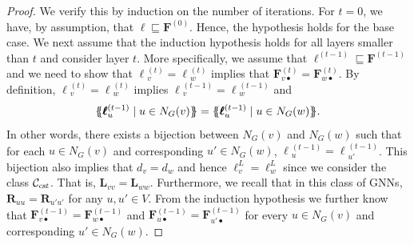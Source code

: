 \begin{proof}
We verify this by induction on the number of iterations. For $t=0$, we have, by assumption, that 
$\pmb{\ell}\sqsubseteq \mathbf{F}^{(0)}$. Hence, the hypothesis holds for the base case.
%
 We next assume that the induction hypothesis holds for all layers smaller than $t$ and consider layer $t$. More specifically, we assume that 
 $\pmb{\ell}^{(t-1)}\sqsubseteq \mathbf{F}^{(t-1)}$ and
we need to show that 
$\pmb{\ell}{}^{(t)}_v=\pmb{\ell}{}^{(t)}_w$ implies that $\mathbf{F}^{(t)}_{v\bullet}=\mathbf{F}^{(t)}_{w\bullet}$. By definition,
$\pmb{\ell}{}^{(t)}_v=\pmb{\ell}{}^{(t)}_w$ implies
$\pmb{\ell}{}^{(t-1)}_v=\pmb{\ell}{}^{(t-1)}_w$ and 
$$
\ldbl \pmb{\ell}{}^{(t-1)}_u \st u \in N_G(v) \rdbl=
 \ldbl \pmb{\ell}{}^{(t-1)}_u \st u \in N_G(w) \rdbl.$$
 In other words, there exists a bijection between $N_G(v)$ and $N_G(w)$ such that for each $u\in N_G(v)$ and corresponding $u'\in N_G(w)$, $\pmb{\ell}{}^{(t-1)}_u=\pmb{\ell}{}^{(t-1)}_{u'}$. This bijection also implies 
 that $d_v=d_w$ and hence $\pmb{\ell}^L_{v}=\pmb{\ell}^L_{w}$ since we consider the class ${\cal C}_{\textsl{cst}}$. That is,
 $\mathbf{L}_{vv}=\mathbf{L}_{ww}$. Furthermore, we recall that in this class of GNNs, $\mathbf{R}_{uu}=\mathbf{R}_{u'u'}$ for any $u,u'\in V$. From the induction hypothesis we further know that 
 $\mathbf{F}^{(t-1)}_{v\bullet}=\mathbf{F}^{(t-1)}_{w\bullet}$ and 
 $\mathbf{F}^{(t-1)}_{u\bullet}=\mathbf{F}^{(t-1)}_{u'\bullet}$ for  every $u\in N_G(v)$ and corresponding $u'\in N_G(w)$.
%
%

\end{proof}
